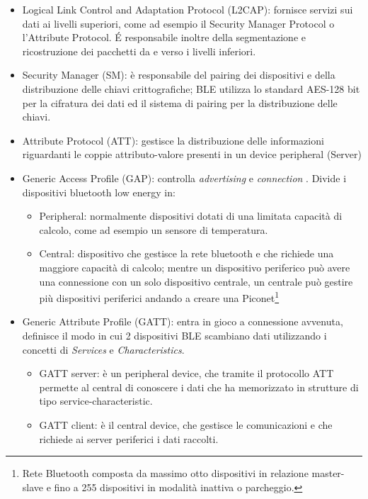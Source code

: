 \begin{itemize}
\begin{itemize}
\item Standby: il dispositivo è in uno stato di attesa caratterizzato da un basso consumo energetico.

\end{itemize}

Lo stato di Scanning può essere attivo (richiede informazioni aggiuntive) o passivo; Lo stato Connection anch'esso si divide in 2 sottostati: Central e Peripheral.

\item Logical Link Control and Adaptation Protocol (L2CAP): fornisce servizi sui dati ai livelli superiori, come ad esempio il Security Manager Protocol o l'Attribute Protocol. \'E responsabile inoltre della segmentazione e ricostruzione dei pacchetti da e verso i livelli inferiori.

\item Security Manager (SM): è responsabile del pairing dei dispositivi e della distribuzione delle chiavi crittografiche; BLE utilizza lo standard AES-128 bit per la cifratura dei dati ed il sistema di pairing per la distribuzione delle chiavi.

\item Attribute Protocol (ATT): gestisce la distribuzione delle informazioni riguardanti le coppie attributo-valore presenti in un device peripheral (Server)

\item Generic Access Profile (GAP): controlla \emph{advertising} e \emph{connection} . Divide i dispositivi bluetooth low energy in:
\begin{itemize}
\item Peripheral: normalmente dispositivi dotati di una limitata capacità di calcolo, come ad esempio un sensore di temperatura.
\item Central: dispositivo che gestisce la rete bluetooth e che richiede una maggiore capacità di calcolo; mentre un dispositivo periferico può avere una connessione con un solo dispositivo centrale, un centrale può gestire più dispositivi periferici andando a creare una Piconet\footnote{Rete Bluetooth composta da massimo otto dispositivi in relazione master-slave e fino a 255 dispositivi in modalità inattiva o parcheggio.}
\end{itemize} 

\item Generic Attribute Profile (GATT): entra in gioco a connessione avvenuta, definisce il modo in cui 2 dispositivi BLE scambiano dati utilizzando i concetti di \emph{Services} e \emph{Characteristics}.

\begin{itemize}
\item GATT server: è un peripheral device, che tramite il protocollo ATT permette al central di conoscere i dati che ha memorizzato in strutture di tipo service-characteristic.
\item GATT client: è il central device, che gestisce le comunicazioni e che richiede ai server periferici i dati raccolti.
\end{itemize}
\end{itemize}

